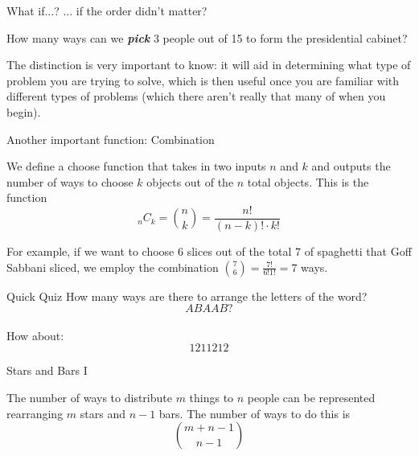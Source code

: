 \documentclass[aspectratio=169,xcolor=dvipsnames]{beamer}
\begin{document}
\begin{frame}[t]{What if...?}
    ... if the order didn't matter?
    
    \vspace{.5em}
    
    How many ways can we \textit{\textbf{pick}} 3 people out of 15 to form the presidential cabinet?

    \vspace{1.5cm}

    The distinction is very important to know: it will aid in determining what type of problem you are trying to solve, which is then useful once you are familiar with different types of problems (which there aren't really that many of when you begin).
\end{frame}

\begin{frame}[t]{Another important function: Combination}
    \begin{definition}
        We define a choose function that takes in two inputs $n$ and $k$ and outputs the number of ways to choose $k$ objects out of the $n$ total objects. This is the function
        \[
        _nC_k=\binom nk=\frac{n!}{(n-k)!\cdot k!}
        \]
    \end{definition}
    
    \vspace{2cm}
    
    For example, if we want to choose $6$ slices out of the total $7$ of spaghetti that Goff Sabbani sliced, we employ the combination $\binom 76=\frac{7!}{6!1!}=7$ ways.
\end{frame}

\begin{frame}[t]{Quick Quiz}
    How many ways are there to arrange the letters of the word?
    \[ABAAB?\]\\
    \vspace{1.5cm}
    How about:
    \[1211212\]
\end{frame}




\begin{frame}[t]{Stars and Bars I}
    \begin{definition}
    The number of ways to distribute $m$ things to $n$ people can be represented rearranging $m$ stars and $n-1$ bars. The number of ways to do this is
    \[
    \binom{m+n-1}{n-1}
    \]
    \end{definition}
\end{frame}
\end{document}
